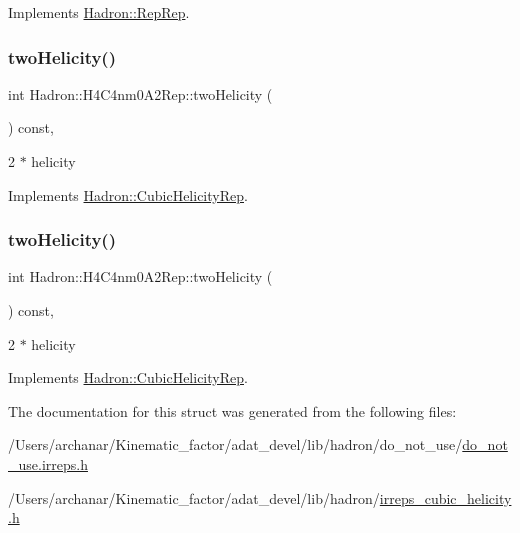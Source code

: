Implements \mbox{\hyperlink{structHadron_1_1RepRep_ab3213025f6de249f7095892109575fde}{Hadron\+::\+Rep\+Rep}}.

\mbox{\label{structHadron_1_1H4C4nm0A2Rep_a347b2b7af8f9ebd8468f2de11f0b6894}} 
\subsubsection{\texorpdfstring{twoHelicity()}{twoHelicity()}\hspace{0.1cm}{\footnotesize\ttfamily [1/2]}}
{\footnotesize\ttfamily int Hadron\+::\+H4\+C4nm0\+A2\+Rep\+::two\+Helicity (\begin{DoxyParamCaption}{ }\end{DoxyParamCaption}) const\hspace{0.3cm}{\ttfamily [inline]}, {\ttfamily [virtual]}}

2 $\ast$ helicity 

Implements \mbox{\hyperlink{structHadron_1_1CubicHelicityRep_af507aa56fc2747eacc8cb6c96db31ecc}{Hadron\+::\+Cubic\+Helicity\+Rep}}.

\mbox{\label{structHadron_1_1H4C4nm0A2Rep_a347b2b7af8f9ebd8468f2de11f0b6894}} 
\subsubsection{\texorpdfstring{twoHelicity()}{twoHelicity()}\hspace{0.1cm}{\footnotesize\ttfamily [2/2]}}
{\footnotesize\ttfamily int Hadron\+::\+H4\+C4nm0\+A2\+Rep\+::two\+Helicity (\begin{DoxyParamCaption}{ }\end{DoxyParamCaption}) const\hspace{0.3cm}{\ttfamily [inline]}, {\ttfamily [virtual]}}

2 $\ast$ helicity 

Implements \mbox{\hyperlink{structHadron_1_1CubicHelicityRep_af507aa56fc2747eacc8cb6c96db31ecc}{Hadron\+::\+Cubic\+Helicity\+Rep}}.



The documentation for this struct was generated from the following files\+:\begin{DoxyCompactItemize}
\item 
/\+Users/archanar/\+Kinematic\+\_\+factor/adat\+\_\+devel/lib/hadron/do\+\_\+not\+\_\+use/\mbox{\hyperlink{do__not__use_8irreps_8h}{do\+\_\+not\+\_\+use.\+irreps.\+h}}\item 
/\+Users/archanar/\+Kinematic\+\_\+factor/adat\+\_\+devel/lib/hadron/\mbox{\hyperlink{lib_2hadron_2irreps__cubic__helicity_8h}{irreps\+\_\+cubic\+\_\+helicity.\+h}}\end{DoxyCompactItemize}
